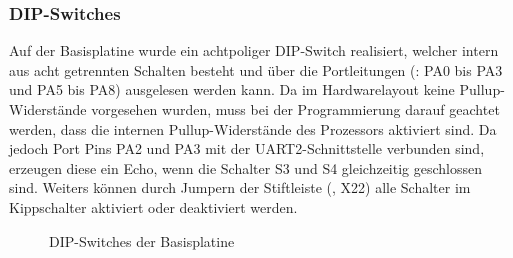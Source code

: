 \subsubsection{DIP-Switches}
\label{sec:basis-dip}
Auf der \gls{Basisplatine} wurde ein achtpoliger DIP-Switch realisiert, welcher intern aus acht getrennten Schalten besteht und über die Portleitungen (: PA0 bis PA3 und PA5 bis PA8) ausgelesen werden kann. Da im Hardwarelayout keine Pullup-Widerstände vorgesehen wurden, muss bei der Programmierung darauf geachtet werden, dass die internen Pullup-Widerstände des Prozessors aktiviert sind. Da jedoch Port Pins PA2 und PA3 mit der UART2-Schnittstelle verbunden sind, erzeugen diese ein Echo, wenn die Schalter S3 und S4 gleichzeitig geschlossen sind. Weiters können durch Jumpern der Stiftleiste (, X22) alle Schalter im Kippschalter aktiviert oder deaktiviert werden.

\begin{figure}[htb]
    \centering
    \qquad
    \qquad
    \caption[DIP-Switches der Basisplatine]{DIP-Switches der \gls{Basisplatine}}
    \label{fig:basisplatine-dip}
\end{figure}

